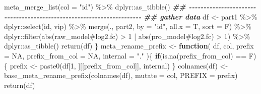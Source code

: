 \documentclass[
]{article}
\newenvironment{Shaded}{\begin{snugshade}}{\end{snugshade}}
\newcommand{\AttributeTok}[1]{\textcolor[rgb]{0.77,0.63,0.00}{#1}}
\newcommand{\ConstantTok}[1]{\textcolor[rgb]{0.00,0.00,0.00}{#1}}
\newcommand{\ControlFlowTok}[1]{\textcolor[rgb]{0.13,0.29,0.53}{\textbf{#1}}}
\newcommand{\DecValTok}[1]{\textcolor[rgb]{0.00,0.00,0.81}{#1}}
\newcommand{\DocumentationTok}[1]{\textcolor[rgb]{0.56,0.35,0.01}{\textbf{\textit{#1}}}}
\newcommand{\FunctionTok}[1]{\textcolor[rgb]{0.00,0.00,0.00}{#1}}
\newcommand{\NormalTok}[1]{#1}
\newcommand{\OtherTok}[1]{\textcolor[rgb]{0.56,0.35,0.01}{#1}}
\newcommand{\SpecialCharTok}[1]{\textcolor[rgb]{0.00,0.00,0.00}{#1}}
\newcommand{\StringTok}[1]{\textcolor[rgb]{0.31,0.60,0.02}{#1}}
\begin{document}
\begin{Shaded}
\begin{Highlighting}[]
      \FunctionTok{meta\_merge\_list}\NormalTok{(}\AttributeTok{col =} \StringTok{"id"}\NormalTok{) }\SpecialCharTok{\%\textgreater{}\%}
\NormalTok{      dplyr}\SpecialCharTok{::}\FunctionTok{as\_tibble}\NormalTok{()}
    \DocumentationTok{\#\# {-}{-}{-}{-}{-}{-}{-}{-}{-}{-}{-}{-}{-}{-}{-}{-}{-}{-}{-}{-}{-}{-}{-}{-}{-}{-}{-}{-}{-}{-}{-}{-}{-}{-}{-}{-}{-}{-}{-}{-}{-}{-}{-}{-}{-}{-}{-}{-}{-}{-}{-}{-}{-}{-}{-}{-}{-}{-}{-}{-}{-}{-}{-}{-}{-}{-}{-}{-}{-}{-} }
    \DocumentationTok{\#\# gather data}
\NormalTok{    df }\OtherTok{\textless{}{-}}\NormalTok{ part1 }\SpecialCharTok{\%\textgreater{}\%}
\NormalTok{      dplyr}\SpecialCharTok{::}\FunctionTok{select}\NormalTok{(id, vip) }\SpecialCharTok{\%\textgreater{}\%}
      \FunctionTok{merge}\NormalTok{(., part2, }\AttributeTok{by =} \StringTok{"id"}\NormalTok{, }\AttributeTok{all.x =}\NormalTok{ T, }\AttributeTok{sort =}\NormalTok{ F) }\SpecialCharTok{\%\textgreater{}\%}
\NormalTok{      dplyr}\SpecialCharTok{::}\FunctionTok{filter}\NormalTok{(}\FunctionTok{abs}\NormalTok{(}\StringTok{\textasciigrave{}}\AttributeTok{raw\_model\#log2.fc}\StringTok{\textasciigrave{}}\NormalTok{) }\SpecialCharTok{\textgreater{}} \DecValTok{1} \SpecialCharTok{|} \FunctionTok{abs}\NormalTok{(}\StringTok{\textasciigrave{}}\AttributeTok{pro\_model\#log2.fc}\StringTok{\textasciigrave{}}\NormalTok{) }\SpecialCharTok{\textgreater{}} \DecValTok{1}\NormalTok{) }\SpecialCharTok{\%\textgreater{}\%}
\NormalTok{      dplyr}\SpecialCharTok{::}\FunctionTok{as\_tibble}\NormalTok{()}
    \FunctionTok{return}\NormalTok{(df)}
\NormalTok{  \}}
\NormalTok{meta\_rename\_prefix }\OtherTok{\textless{}{-}} 
  \ControlFlowTok{function}\NormalTok{(}
\NormalTok{           df,}
\NormalTok{           col,}
           \AttributeTok{prefix =} \ConstantTok{NA}\NormalTok{,}
           \AttributeTok{prefix\_from\_col =} \ConstantTok{NA}\NormalTok{,}
           \AttributeTok{internal =} \StringTok{"."}
\NormalTok{           )\{}
    \ControlFlowTok{if}\NormalTok{(}\FunctionTok{is.na}\NormalTok{(prefix\_from\_col) }\SpecialCharTok{==}\NormalTok{ F)\{}
\NormalTok{      prefix }\OtherTok{\textless{}{-}} \FunctionTok{paste0}\NormalTok{(df[}\DecValTok{1}\NormalTok{, ][[prefix\_from\_col]], internal)}
\NormalTok{    \}}
    \FunctionTok{colnames}\NormalTok{(df) }\OtherTok{\textless{}{-}} \FunctionTok{base\_meta\_rename\_prefix}\NormalTok{(}\FunctionTok{colnames}\NormalTok{(df),}
                                            \AttributeTok{mutate =}\NormalTok{ col,}
                                            \AttributeTok{PREFIX =}\NormalTok{ prefix)}
    \FunctionTok{return}\NormalTok{(df)}

\end{Highlighting}
\end{Shaded}
\end{document}
